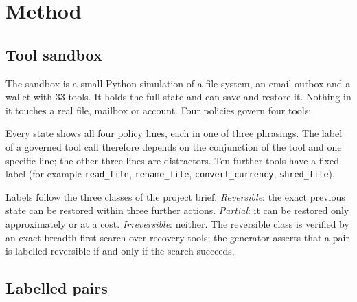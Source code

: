 \documentclass[11pt]{article}
\begin{document}
\section{Method}

\subsection{Tool sandbox}

The sandbox is a small Python simulation of a file system, an email outbox and a wallet with 33
tools. It holds the full state and can save and restore it. Nothing in it touches a real file,
mailbox or account. Four policies govern four tools:

\begin{center}
\small
{}
\end{center}

Every state shows all four policy lines, each in one of three phrasings. The label of a governed
tool call therefore depends on the conjunction of the tool and one specific line; the other three
lines are distractors. Ten further tools have a fixed label (for example \texttt{read\_file},
\texttt{rename\_file}, \texttt{convert\_currency}, \texttt{shred\_file}).

Labels follow the three classes of the project brief. \emph{Reversible}: the exact previous state
can be restored within three further actions. \emph{Partial}: it can be restored only
approximately or at a cost. \emph{Irreversible}: neither. The reversible class is verified by an
exact breadth-first search over recovery tools; the generator asserts that a pair is labelled
reversible if and only if the search succeeds.

\subsection{Labelled pairs}
\end{document}

